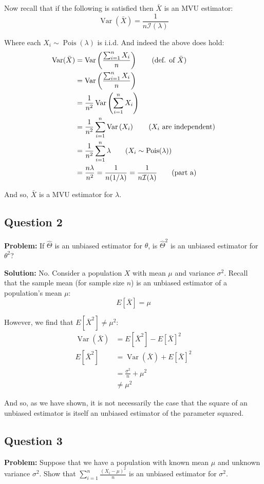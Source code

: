 \documentclass{article}
\DeclareMathOperator{\Var}{Var}
\begin{document}
Now recall that if the following is satisfied then $\bar{X}$ is an MVU estimator:
$$\Var(\bar{X})=\frac{1}{n\mathcal I(\lambda)}$$

Where each $X_i\sim\operatorname{Pois}(\lambda)$ is i.i.d. And indeed the above does hold:
\begin{align*}
  \Var(\bar{X})&=\Var\left(\frac{\sum_{i=1}^nX_i}{n}\right)\tag{def. of $\bar{X}$}\\
  &=\Var\left(\frac{\sum_{i=1}^nX_i}{n}\right)\\
  &=\frac{1}{n^2}\Var\left(\sum_{i=1}^nX_i\right)\\
  &=\frac{1}{n^2}\sum_{i=1}^n\Var\left(X_i\right)\tag{$X_i$ are independent}\\
  &=\frac{1}{n^2}\sum_{i=1}^n\lambda\tag{$X_i\sim\operatorname{Pois}(\lambda)$}\\
  &=\frac{n\lambda}{n^2}=\frac{1}{n(1/\lambda)}=\frac{1}{n\mathcal I(\lambda)}\tag{part a}
\end{align*}

And so, $\bar{X}$ is a MVU estimator for $\lambda$.
\bigskip

\subsection*{Question 2}
\noindent\textbf{Problem:} If $\hat{\Theta}$ is an unbiased estimator for $\theta$, is $\hat{\Theta}^2$ is an unbiased estimator for $\theta^2$?
\bigskip

\noindent\textbf{Solution:} No. Consider a population $X$ with mean $\mu$ and variance $\sigma^2$. Recall that the sample mean (for sample size $n$) is an unbiased estimator of a population's mean $\mu$:
$$E[\bar{X}]=\mu$$

However, we find that $E[\bar{X}^2]\not=\mu^2$:
\begin{align*}
  \Var(\bar{X})&=E[\bar{X}^2]-E[\bar{X}]^2\tag{true of any RV}\\
  E[\bar{X}^2]&=\Var(\bar{X})+E[\bar{X}]^2\\
  &=\frac{\sigma^2}{n}+\mu^2\tag{mean/variance of sample mean}\\
  &\not=\mu^2
\end{align*}

And so, as we have shown, it is not necessarily the case that the square of an unbiased estimator is itself an unbiased estimator of the parameter squared.
\newpage

\subsection*{Question 3}
\noindent\textbf{Problem:}  Suppose that we have a population with known mean $\mu$ and unknown variance $\sigma^2$. Show that $\sum_{i=1}^n\frac{(X_i-\mu)^2}{n}$ is an unbiased estimator for $\sigma^2$.
\bigskip
\end{document}
